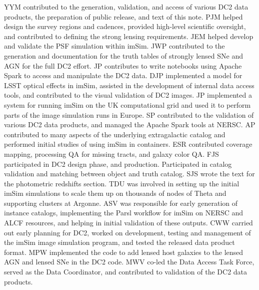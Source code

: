 \documentclass[modern]{descnote}
\begin{document}
YYM contributed to the generation, validation, and access of various DC2 data products, the preparation of public release, and text of this note.
%
PJM helped design the survey regions and cadences, provided high-level scientific oversight, and contributed to defining the strong lensing requirements.
%
JEM helped develop and validate the PSF simulation within imSim.
%
JWP contributed to the generation and documentation for the truth tables of strongly lensed SNe and AGN for the full DC2 effort.
%
JP contributes to write notebooks using Apache Spark to access and manipulate the DC2 data.
%
DJP implemented a model for LSST optical effects in imSim, assisted in the development of internal data access tools, and contributed to the visual validation of DC2 images.
%
JP implemented a system for running imSim on the UK computational grid and used it to perform parts of the image simulation runs in Europe.
%
SP contributed to the validation of various DC2 data products, and managed the Apache Spark tools at NERSC.
%
AP contributed to many aspects of the underlying extragalactic catalog and performed initial studies of using imSim in containers.
%
ESR contributed coverage mapping, processing QA for missing tracts, and galaxy color QA.
%
FJS participated in DC2 design phase, and production. Participated in catalog validation and matching between object and truth catalog.
%
SJS wrote the text for the photometric redshifts section.
%
TDU was involved in setting up the initial imSim simulations to scale them up  on thousands of nodes of Theta and supporting clusters at Argonne.
ASV was responsible for early generation of instance catalogs, implementing the Parsl workflow for imSim on NERSC and ALCF resources, and helping in initial validation of these outputs.
%
CWW carried out early planning for DC2, worked on development, testing and management of the imSim image simulation program, and tested the released data product format.
%
MPW implemented the code to add lensed host galaxies to the lensed AGN and lensed SNe in the DC2 code.
%
MWV co-led the Data Access Task Force, served as the Data Coordinator, and contributed to validation of the DC2 data products.
%

\clearpage
{}
{}



\end{document}
